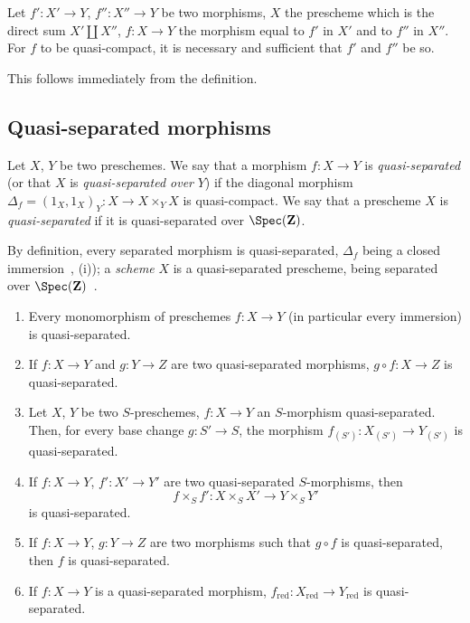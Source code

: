 \begin{proposition}[1.1.6]
\label{IV.1.1.6}
Let $f':X'\to Y$, $f'':X''\to Y$ be two morphisms, $X$ the prescheme
which is the direct sum $X'\coprod X''$, $f:X\to Y$ the morphism equal to $f'$ in $X'$ and to $f''$ in $X''$. For $f$ to be
quasi-compact, it is necessary and sufficient that $f'$ and $f''$ be so.
\end{proposition}

This follows immediately from the definition.

\subsection{Quasi-separated morphisms}
\label{subsection:IV.1.2}

\begin{definition}[1.2.1]
\label{IV.1.2.1}
Let $X$, $Y$ be two preschemes. We say that a morphism $f:X\to Y$ is
\emph{quasi-separated} (or that $X$ is \emph{quasi-separated over} $Y$) if the diagonal morphism $\Delta_f=(1_X,1_X)_Y:X\to X\times_Y X$
is quasi-compact. We say that a prescheme $X$ is \emph{quasi-separated} if it is quasi-separated over $\Spec(\mathbf{Z})$.
\end{definition}

By definition, every separated morphism is quasi-separated, $\Delta_f$ being a closed immersion~, (i)); a \emph{scheme} $X$ is a quasi-separated prescheme, being separated over
$\Spec(\mathbf{Z})$~.

\begin{proposition}[1.2.2]
\label{IV.1.2.2}
\medskip\noindent
\begin{enumerate}[label=(\roman*)]
  \item Every monomorphism of preschemes $f:X\to Y$ \textnormal{(}in particular
    every immersion\textnormal{)} is quasi-separated.
  \item If $f:X\to Y$ and $g:Y\to Z$ are two quasi-separated morphisms, $g\circ f:X\to Z$ is
    quasi-separated.
  \item Let $X$, $Y$ be two $S$-preschemes, $f:X\to Y$ an $S$-morphism quasi-separated. Then,
    for every base change $g:S'\to S$, the morphism $f_{(S')}:X_{(S')}\to Y_{(S')}$ is quasi-separated.
  \item If $f:X\to Y$, $f':X'\to Y'$ are two quasi-separated $S$-morphisms, then
    \[
      f\times_S f': X\times_S X'\to Y\times_S Y'
    \]
    is quasi-separated.
  \item If $f:X\to Y$, $g:Y\to Z$ are two morphisms such that $g\circ f$ is quasi-separated, then $f$
    is quasi-separated.
  \item If $f:X\to Y$ is a quasi-separated morphism, $f_{\mathrm{red}}:X_{\mathrm{red}}\to Y_{\mathrm{red}}$ is quasi-separated.
\end{enumerate}
\end{proposition}

